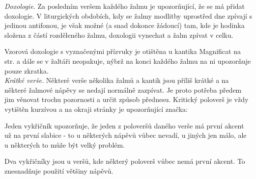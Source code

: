 \documentclass[a5paper, twoside]{article}
\begin{document}
\pagestyle{empty}
\titulniStrankaSvazkuAntifonare

\textit{Doxologie.} Za posledním veršem každého žalmu je  u\-po\-zor\-ňu\-jí\-cí,
že se má přidat doxologie. V liturgických obdobích, kdy se žalmy modlitby uprostřed
dne zpívají s jedinou antifonou, je však možné (a snad dokonce žádoucí)
tam, kde je hodinka složena z částí
rozděleného žalmu, doxologii vynechat a žalm zpívat v celku.

Vzorová doxologie s vyznačenými přízvuky je otištěna u kantika Magnificat
na str. \pageref{magnificat} a dále se v žaltáři neopakuje, nýbrž na konci
každého žalmu na ni upozorňuje pouze zkratka.\\

\textit{Krátké verše.} Některé verše několika žalmů a kantik jsou příliš krátké a na některé žalmové nápěvy se nedají normálně zazpívat. Je proto potřeba
předem jim věnovat trochu pozornosti a určit způsob přednesu.
Kritický poloverš je vždy vytištěn kurzívou a na okraji stránky je 
upozorňující značka:

Jeden vykřičník upozorňuje, že jeden z poloveršů daného verše má první
akcent už na první slabice - to u některých nápěvů vůbec nevadí, u jiných
jen málo, ale u některých to může být velký problém.

Dva vykřičníky jsou u veršů, kde některý poloverš vůbec nemá první
akcent. To znesnadňuje použití většiny nápěvů.
\newpage

\setlength{\columnseprule}{1pt} %
\setlength{\columnsep}{20pt} %

\titleformat{\subsection}[hang]{\large\bfseries}{}{0pt}{\thetitle\quad}
\titleformat{\subsubsection}[hang]{\bfseries}{}{0pt}{\thetitle\quad}


\fancyhead{}
\fancyhead[LE,RO]{\thepage}
\fancyfoot{}

\pagestyle{fancy}

\end{document}
